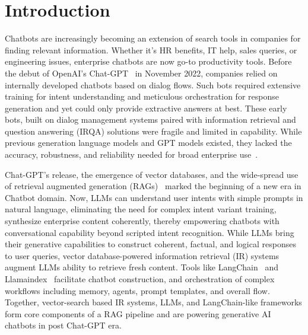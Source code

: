 \documentclass[sigconf]{acmart}
\begin{document}
\maketitle

\section{Introduction}

Chatbots are increasingly becoming an extension of search tools in companies for finding relevant information. Whether it's HR benefits, IT help, sales queries, or engineering issues, enterprise chatbots are now go-to productivity tools. Before the debut of OpenAI's Chat-GPT~\cite{achiam2023gpt} in November 2022, companies relied on internally developed chatbots  based on dialog flows. Such bots required extensive training for intent understanding and meticulous orchestration for response generation and yet could only provide extractive answers at best. These early bots, built on dialog management systems paired with information retrieval and question answering (IRQA) solutions were fragile and limited in capability. While previous generation language models and GPT models existed, they lacked the accuracy, robustness, and reliability needed for broad enterprise use~\cite{galitsky2019developing}. 

Chat-GPT's release, the emergence of vector databases, and the wide-spread use of retrieval augmented generation (RAGs)~\cite{lewis2020retrieval} marked the beginning of a new era in Chatbot domain. Now, LLMs can understand user intents with simple prompts in natural language, eliminating the need for complex intent variant training, synthesize enterprise content coherently, thereby empowering chatbots with conversational capability beyond scripted intent recognition. While LLMs bring their generative capabilities to construct coherent, factual, and logical responses to user queries, vector database-powered information retrieval (IR) systems augment LLMs ability to retrieve fresh content. Tools like LangChain~\cite{Langchain} and Llamaindex~\cite{Liu_LlamaIndex_2022} facilitate chatbot construction, and orchestration of complex workflows including memory, agents, prompt templates, and overall flow. Together, vector-search based IR systems, LLMs, and LangChain-like frameworks form core components of a RAG pipeline and are powering generative AI chatbots in post Chat-GPT era.
\end{document}
